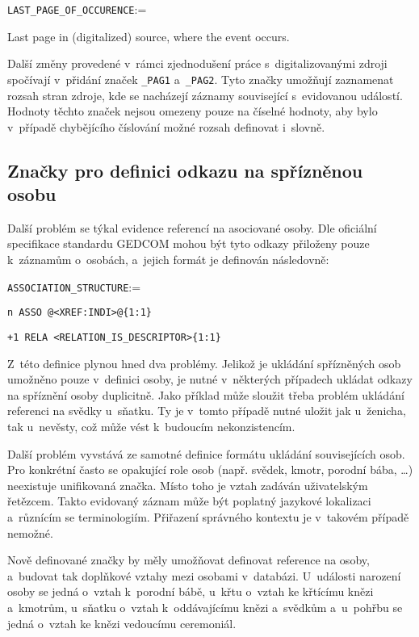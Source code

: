 		\vspace{1em}
		\verb|LAST_PAGE_OF_OCCURENCE|:=\par
		\quad Last page in (digitalized) source, where the event occurs.
		\vspace{1em}
		
		Další změny provedené v~rámci zjednodušení práce s~digitalizovanými zdroji spočívají v~přidání značek \verb|_PAG1| a~\verb|_PAG2|. Tyto značky umožňují zaznamenat rozsah stran zdroje, kde se nacházejí záznamy související s~evidovanou událostí. Hodnoty těchto značek nejsou omezeny pouze na číselné hodnoty, aby bylo v~případě chybějícího číslování možné rozsah definovat i~slovně. \par
			
			
		\subsection*{Značky pro definici odkazu na spřízněnou osobu}
		Další problém se týkal evidence referencí na asociované osoby. Dle oficiální specifikace standardu GEDCOM mohou být tyto odkazy přiloženy pouze k~záznamům o~osobách, a~jejich formát je definován následovně:\par
		\vspace{1em}
		\verb|ASSOCIATION_STRUCTURE|:=\par
		\quad \verb|n ASSO @<XREF:INDI>@|\hfill\verb|{1:1}|\par
		\quad \quad \verb|+1 RELA <RELATION_IS_DESCRIPTOR>|\hfill\verb|{1:1}|\par
		\vspace{1em}
		Z~této definice plynou hned dva problémy. Jelikož je ukládání spřízněných osob umožněno pouze v~definici osoby, je nutné v~některých případech ukládat odkazy na spříznění osoby duplicitně. Jako příklad může sloužit třeba problém ukládání referenci na svědky u~sňatku. Ty je v~tomto případě nutné uložit jak u~ženicha, tak u~nevěsty, což může vést k~budoucím nekonzistencím. \par
		Další problém vyvstává ze samotné definice formátu ukládání souvisejících osob. Pro konkrétní často se opakující role osob (např. svědek, kmotr, porodní bába, \ldots) neexistuje unifikovaná značka. Místo toho je vztah zadáván uživatelským řetězcem. Takto evidovaný záznam může být poplatný jazykové lokalizaci a~různícím se terminologiím. Přiřazení správného kontextu je v~takovém případě nemožné.\par
		Nově definované značky by měly umožňovat definovat reference na osoby, a~budovat tak doplňkové vztahy mezi osobami v~databázi. U~události narození osoby se jedná o~vztah k~porodní bábě, u~křtu o~vztah ke křtícímu knězi a~kmotrům, u~sňatku o~vztah k~oddávajícímu knězi a~svědkům a~u~pohřbu se jedná o~vztah ke knězi vedoucímu ceremoniál. \par
